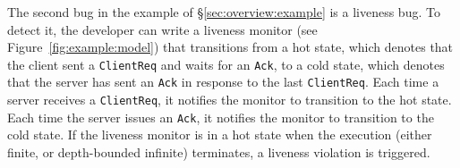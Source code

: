 
The second bug in the example of \S\ref{sec:overview:example} is a liveness bug. To detect it, the developer can write a liveness monitor (see Figure~\ref{fig:example:model}) that transitions from a hot state, which denotes that the client sent a \texttt{ClientReq} and waits for an \texttt{Ack}, to a cold state, which denotes that the server has sent an \texttt{Ack} in response to the last \texttt{ClientReq}. Each time a server receives a \texttt{ClientReq}, it notifies the monitor to transition to the hot state. Each time the server issues an \texttt{Ack}, it notifies the monitor to transition to the cold state. If the liveness monitor is in a hot state when the execution (either finite, or depth-bounded infinite) terminates, a liveness violation is triggered.



